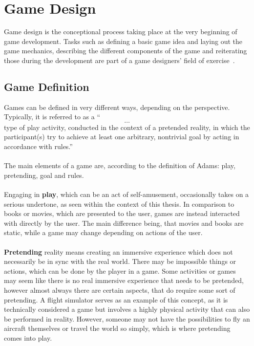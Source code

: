 \section{Game Design}\label{sec:game-design}
Game design is the conceptional process taking place at the very beginning of game development.
Tasks such as defining a basic game idea and laying out the game mechanics, describing the different components of the game and
reiterating those during the development are part of a game designers' field of exercise~\cite{10.5555/2544002}.

\subsection{Game Definition}\label{subsec:game-definition}
Games can be defined in very different ways, depending on the perspective.
Typically, it is referred to as a ``\[\ldots\] type of play activity, conducted in the context of a pretended reality, in which the participant(s)
try to achieve at least one arbitrary, nontrivial goal by acting in accordance with rules.''~\cite{10.5555/2544002}
\\
\\
The main elements of a game are, according to the definition of Adams: play, pretending, goal and rules.
\\
\\
Engaging in \textbf{play}, which can be an act of self-amusement, occasionally takes on a serious undertone, as seen within the context of this thesis.
In comparison to books or movies, which are presented to the user, games are instead interacted with directly by the user.
The main difference being, that movies and books are static, while a game may change depending on actions of the user.
\\
\\
\textbf{Pretending} reality means creating an immersive experience which does not necessarily be in sync with the real world.
There may be impossible things or actions, which can be done by the player in a game.
Some activities or games may seem like there is no real immersive experience that needs to be pretended, however almost always there are certain
aspects, that do require some sort of pretending.
A flight simulator serves as an example of this concept, as it is technically considered a game but involves a highly physical activity that can also be performed in reality.
However, someone may not have the possibilities to fly an aircraft themselves or travel the world so simply, which is where pretending comes into play.
